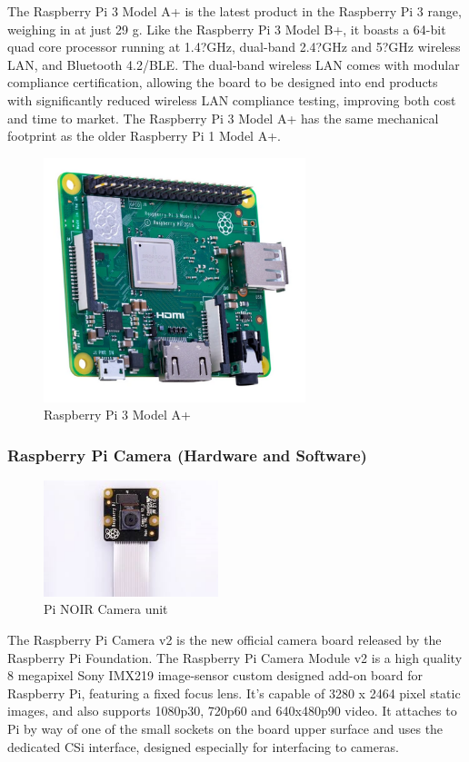 \par The Raspberry Pi 3 Model A+ is the latest product in the Raspberry Pi 3 range, weighing in at just 29 g. Like the Raspberry Pi 3 Model B+, it boasts a 64-bit quad core processor running at 1.4?GHz, dual-band 2.4?GHz and 5?GHz wireless LAN, and Bluetooth 4.2/BLE. The dual-band wireless LAN comes with modular compliance certification, allowing the board to be designed into end products with significantly reduced wireless LAN compliance testing, improving both cost and time to market. The Raspberry Pi 3 Model A+ has the same mechanical footprint as the older Raspberry Pi 1 Model A+.
	\begin{figure}[h]
		\centering
		\includegraphics[width=3in]{rasPi.png}
		\caption{Raspberry Pi 3 Model A+}
	\end{figure}
\subsubsection{Raspberry Pi Camera (Hardware and Software)}
\begin{figure}[h]
	\centering
	\includegraphics[width=2in]{picam.jpg}
	\caption{Pi NOIR Camera unit}
\end{figure}
\par The Raspberry Pi Camera v2 is the new official camera board released by the Raspberry Pi Foundation. The Raspberry Pi Camera Module v2 is a high quality 8 megapixel Sony IMX219 image-sensor custom designed add-on board for Raspberry Pi, featuring a fixed focus lens. It's capable of 3280 x 2464 pixel static images, and also supports 1080p30, 720p60 and 640x480p90 video. It attaches to Pi by way of one of the small sockets on the board upper surface and uses the dedicated CSi interface, designed especially for interfacing to cameras.

